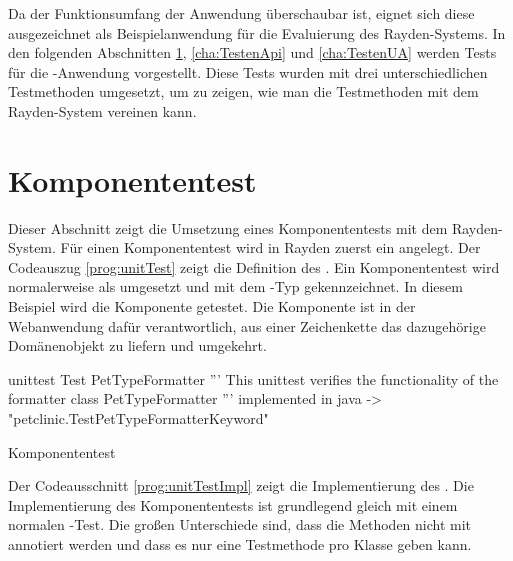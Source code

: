 \SuperPar
Da der Funktionsumfang der Anwendung überschaubar ist, eignet sich diese ausgezeichnet als Beispielanwendung für die Evaluierung des Rayden-Systems. In den folgenden Abschnitten \ref{cha:TestenUnit}, \ref{cha:TestenApi} und \ref{cha:TestenUA} werden Tests für die -Anwendung vorgestellt. Diese Tests wurden mit drei unterschiedlichen Testmethoden umgesetzt, um zu zeigen, wie man die Testmethoden mit dem Rayden-System vereinen kann.

\section{Komponententest}
\label{cha:TestenUnit}

Dieser Abschnitt zeigt die Umsetzung eines Komponententests mit dem Rayden-System. Für einen Komponententest wird in Rayden zuerst ein  angelegt. Der Codeauszug \ref{prog:unitTest} zeigt die Definition des . Ein Komponententest wird normalerweise als  umgesetzt und mit dem -Typ  gekennzeichnet. In diesem Beispiel wird die Komponente  getestet. Die Komponente ist in der Webanwendung dafür verantwortlich, aus einer Zeichenkette das dazugehörige Domänenobjekt zu liefern und umgekehrt. 

\begin{program}
\begin{JavaCode}
unittest Test PetTypeFormatter {
	''' This unittest verifies the functionality of the 
	    formatter class PetTypeFormatter '''
	implemented in java -> "petclinic.TestPetTypeFormatterKeyword"
}
\end{JavaCode}
\caption{Komponententest }
\label{prog:unitTest}
\end{program}

\SuperPar
Der Codeausschnitt \ref{prog:unitTestImpl} zeigt die Implementierung des . Die Implementierung des Komponententests ist grundlegend gleich mit einem normalen -Test. Die großen Unterschiede sind, dass die Methoden nicht mit  annotiert werden und dass es nur eine Testmethode pro Klasse geben kann. 

